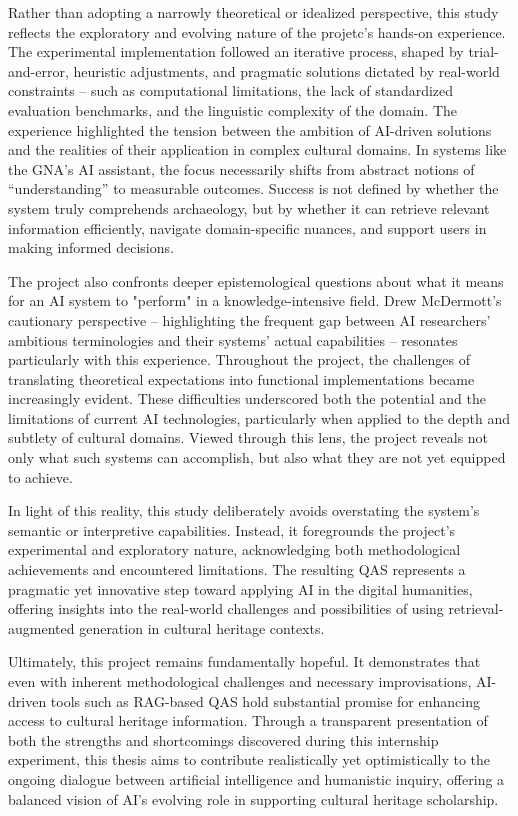 \begin{spacing}{1.5}
Rather than adopting a narrowly theoretical or idealized perspective, this study reflects the exploratory and evolving nature of the projetc's hands-on experience. The experimental implementation followed an iterative process, shaped by trial-and-error, heuristic adjustments, and pragmatic solutions dictated by real-world constraints -- such as computational limitations, the lack of standardized evaluation benchmarks, and the linguistic complexity of the domain. The experience highlighted the tension between the ambition of AI-driven solutions and the realities of their application in complex cultural domains. In systems like the GNA’s AI assistant, the focus necessarily shifts from abstract notions of “understanding” to measurable outcomes. Success is not defined by whether the system truly comprehends archaeology, but by whether it can retrieve relevant information efficiently, navigate domain-specific nuances, and support users in making informed decisions.

The project also confronts deeper epistemological questions about what it means for an AI system to "perform" in a knowledge-intensive field. Drew McDermott’s cautionary perspective \citep{mcdermott_artificial_1976} -- highlighting the frequent gap between AI researchers' ambitious terminologies and their systems’ actual capabilities -- resonates particularly with this experience. Throughout the project, the challenges of translating theoretical expectations into functional implementations became increasingly evident. These difficulties underscored both the potential and the limitations of current AI technologies, particularly when applied to the depth and subtlety of cultural domains. Viewed through this lens, the project reveals not only what such systems can accomplish, but also what they are not yet equipped to achieve. 

In light of this reality, this study deliberately avoids overstating the system’s semantic or interpretive capabilities. Instead, it foregrounds the project’s experimental and exploratory nature, acknowledging both methodological achievements and encountered limitations. The resulting QAS represents a pragmatic yet innovative step toward applying AI in the digital humanities, offering insights into the real-world challenges and possibilities of using retrieval-augmented generation in cultural heritage contexts.

Ultimately, this project remains fundamentally hopeful. It demonstrates that even with inherent methodological challenges and necessary improvisations, AI-driven tools such as RAG-based QAS hold substantial promise for enhancing access to cultural heritage information. Through a transparent presentation of both the strengths and shortcomings discovered during this internship experiment, this thesis aims to contribute realistically yet optimistically to the ongoing dialogue between artificial intelligence and humanistic inquiry, offering a balanced vision of AI’s evolving role in supporting cultural heritage scholarship.

\end{spacing}